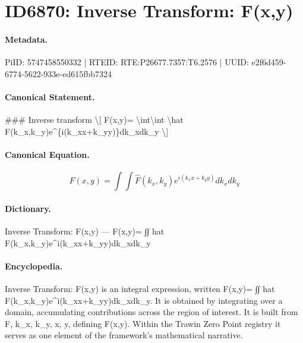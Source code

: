 \section*{ID6870: Inverse Transform: F(x,y)}
\paragraph{Metadata.}
PiID: 5747458550332 | RTEID: RTE:P26677.7357:T6.2576 | UUID: e2f6d459-6774-5622-933e-ed615fbb7324

\paragraph{Canonical Statement.}
\#\#\# Inverse transform \textbackslash{}[ F(x,y)= \textbackslash{}int\textbackslash{}int \textbackslash{}hat F(k\_x,k\_y)e\textasciicircum{}\{i(k\_xx+k\_yy)\}dk\_xdk\_y \textbackslash{}]

\paragraph{Canonical Equation.}
\[
F(x,y)= \int\int \hat F(k_x,k_y)e^{i(k_xx+k_yy)}dk_xdk_y
\]

\paragraph{Dictionary.}
Inverse Transform: F(x,y) — F(x,y)= ∫∫ hat F(k\_x,k\_y)e\textasciicircum{}i(k\_xx+k\_yy)dk\_xdk\_y

\paragraph{Encyclopedia.}
Inverse Transform: F(x,y) is an integral expression, written F(x,y)= ∫∫ hat F(k\_x,k\_y)e\textasciicircum{}i(k\_xx+k\_yy)dk\_xdk\_y. It is obtained by integrating over a domain, accumulating contributions across the region of interest. It is built from F, k\_x, k\_y, x, y, defining F(x,y). Within the Trawin Zero Point registry it serves as one element of the framework's mathematical narrative.

